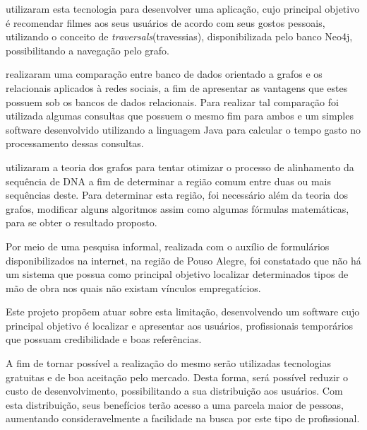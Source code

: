 \par {} utilizaram esta tecnologia para desenvolver uma aplicação, cujo principal objetivo é recomendar filmes aos seus usuários de acordo com seus gostos pessoais, utilizando o conceito de \textit{traversals}(travessias), disponibilizada pelo banco Neo4j, possibilitando a navegação pelo grafo.

\par {} realizaram uma comparação entre banco de dados orientado a grafos e os relacionais aplicados à redes sociais, a fim de apresentar as vantagens que estes possuem sob os bancos de dados relacionais. Para realizar tal comparação foi utilizada algumas consultas que possuem o mesmo fim para ambos e um simples software desenvolvido utilizando a linguagem Java para calcular o tempo gasto no processamento dessas consultas.

\par {} utilizaram a teoria dos grafos para tentar otimizar o processo de alinhamento da sequência de DNA a fim de determinar a região comum entre duas ou mais sequências deste. Para determinar esta região, foi necessário além da teoria dos grafos, modificar alguns algoritmos assim como algumas fórmulas matemáticas, para se obter o resultado proposto.

\par Por meio de uma pesquisa informal, realizada com o auxílio de formulários disponibilizados na internet, na região de Pouso Alegre, foi constatado que não há um sistema que possua como principal objetivo localizar determinados tipos de mão de obra nos quais não existam vínculos empregatícios.

\par Este projeto propõem atuar sobre esta limitação, desenvolvendo um software cujo principal objetivo é localizar e apresentar aos usuários, profissionais temporários que possuam credibilidade e boas referências.

\par A fim de tornar possível a realização do mesmo serão utilizadas tecnologias gratuitas e de boa aceitação pelo mercado. Desta forma, será possível reduzir o custo de desenvolvimento, possibilitando a sua distribuição aos usuários. Com esta distribuição, seus benefícios terão acesso a uma parcela maior de pessoas, aumentando consideravelmente a facilidade na busca por este tipo de profissional.


